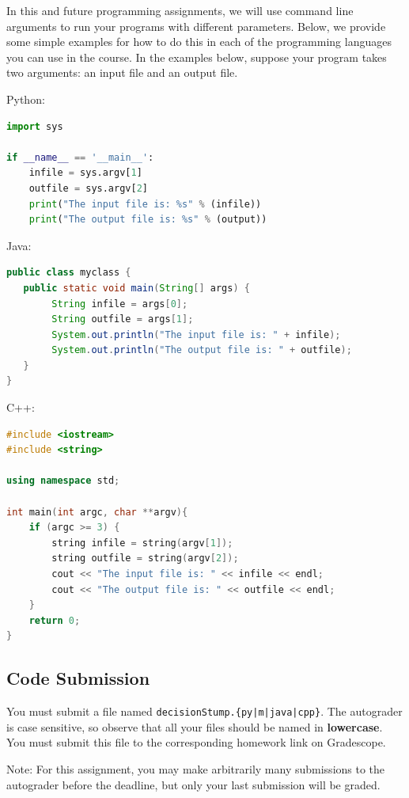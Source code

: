 \documentclass[11pt,addpoints,answers]{exam}
\numberwithin{equation}{section} %
\numberwithin{figure}{section} %
\numberwithin{table}{section} %
\begin{document}
In this and future programming assignments, we will use command line arguments to run your programs with different parameters. Below, we provide some simple examples for how to do this in each of the programming languages you can use in the course. In the examples below, suppose your program takes two arguments: an input file and an output file.

Python:
\begin{lstlisting}[language=Python]
import sys

if __name__ == '__main__':
    infile = sys.argv[1]
    outfile = sys.argv[2]
    print("The input file is: %s" % (infile))
    print("The output file is: %s" % (output))
\end{lstlisting}
 
Java:
\begin{lstlisting}[language=Java]
public class myclass {
   public static void main(String[] args) {
        String infile = args[0];
        String outfile = args[1];
        System.out.println("The input file is: " + infile);
        System.out.println("The output file is: " + outfile);
   }
}
\end{lstlisting}

C++:
\begin{lstlisting}[language=C++]
#include <iostream>
#include <string>

using namespace std;

int main(int argc, char **argv){
    if (argc >= 3) {
        string infile = string(argv[1]);
        string outfile = string(argv[2]);
        cout << "The input file is: " << infile << endl;
        cout << "The output file is: " << outfile << endl;
    }
    return 0;
}
\end{lstlisting}
\subsection{Code Submission}

You must submit a file named \texttt{decisionStump.\{py|m|java|cpp\}}. The autograder is case sensitive, so observe that all your files should be named in \textbf{lowercase}. You must submit this file to the corresponding homework link on Gradescope.

Note: For this assignment, you may make arbitrarily many submissions to the autograder before the deadline, but only your last submission will be graded.


\end{document}
